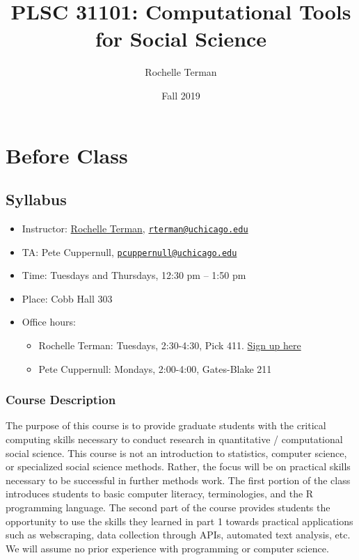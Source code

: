 \documentclass[]{book}
\title{PLSC 31101: Computational Tools for Social Science}
\author{Rochelle Terman}
\date{Fall 2019}
\providecommand{\tightlist}{%
  \setlength{\itemsep}{0pt}\setlength{\parskip}{0pt}}
\begin{document}
\maketitle

{
\setcounter{tocdepth}{1}
\tableofcontents
}
\hypertarget{part-before-class}{%
\part{Before Class}\label{part-before-class}}

\hypertarget{syllabus}{%
\chapter{Syllabus}\label{syllabus}}

\begin{itemize}
\item
  Instructor: \href{http://rochelleterman.com/}{Rochelle Terman}, \href{mailto:rterman@uchicago.edu}{\nolinkurl{rterman@uchicago.edu}}
\item
  TA: Pete Cuppernull, \href{mailto:pcuppernull@uchicago.edu}{\nolinkurl{pcuppernull@uchicago.edu}}
\item
  Time: Tuesdays and Thursdays, 12:30 pm -- 1:50 pm
\item
  Place: Cobb Hall 303
\item
  Office hours:

  \begin{itemize}
  \tightlist
  \item
    Rochelle Terman: Tuesdays, 2:30-4:30, Pick 411. \href{https://www.wejoinin.com/sheets/offrq}{Sign up here}
  \item
    Pete Cuppernull: Mondays, 2:00-4:00, Gates-Blake 211
  \end{itemize}
\end{itemize}

\hypertarget{course-description}{%
\section{Course Description}\label{course-description}}

The purpose of this course is to provide graduate students with the critical computing skills necessary to conduct research in quantitative / computational social science. This course is not an introduction to statistics, computer science, or specialized social science methods. Rather, the focus will be on practical skills necessary to be successful in further methods work. The first portion of the class introduces students to basic computer literacy, terminologies, and the R programming language. The second part of the course provides students the opportunity to use the skills they learned in part 1 towards practical applications such as webscraping, data collection through APIs, automated text analysis, etc. We will assume no prior experience with programming or computer science.
\end{document}
